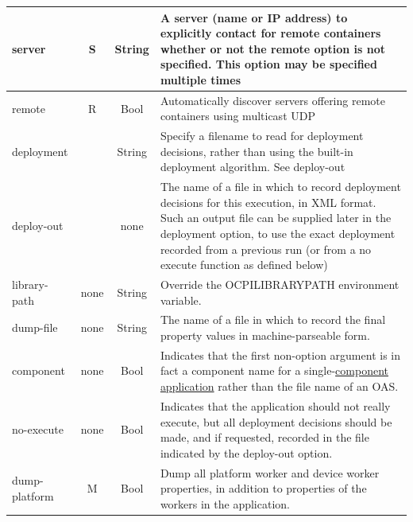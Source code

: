 \documentclass[10pt, a4paper, oneside]{article}
\renewcommand\_{\textunderscore\allowbreak} %
\begin{document}
\begin{center}
\begin{longtable}{|l|c|c|p{11cm}|}
\hline 
 server& S & String & A server (name or IP address) to explicitly contact for remote containers whether or not the remote option is not specified.  
This option may be specified multiple times\\ 
\hline 
remote & R & Bool & Automatically discover servers offering remote containers using multicast UDP\\ 
\hline
 deployment & {} & String & Specify a filename to read for deployment decisions, rather than using the built-in deployment algorithm.  See deploy-out\\ 
\hline 
deploy-out & {} & none & The name of a file in which to record deployment decisions for this execution, in XML format. Such an output file can be supplied later in the deployment option, to use the exact deployment recorded from a previous run (or from a no execute function as defined below)\\ 
\hline
library-path& none & String&Override the OCPI\_LIBRARY\_PATH environment variable.\\ 
\hline 
dump-file & none & String &The name of a file in which to record the final property values in machine-parseable form.\\ 
\hline 
component & none & Bool & Indicates that the first non-option argument is in fact a component name for a single-\hyperlink{component application}{component application} rather than the file name of an OAS.\\ 
\hline 
no-execute & none & Bool & Indicates that the application should not really execute, but all deployment decisions should be made, and if requested, recorded in the file indicated by the deploy-out option.\\ 
\hline
dump-platform & M & Bool& Dump all platform worker and device worker properties, in addition to properties of the workers in the application.\\
\hline
\end{longtable}
\end{center}
\end{document}
